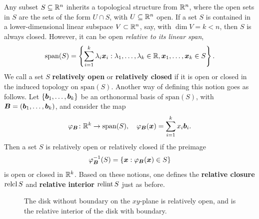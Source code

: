 Any subset $S\subseteq \mathbb{R}^n$ inherits a topological structure from $\mathbb{R}^n$, where the open sets in $S$ are the sets of the form $U\cap S$, with $U\subseteq \mathbb{R}^n$ open. 
If a set $S$ is contained in a lower-dimensional linear subspace $V\subset \mathbb{R}^n$, say, with $\dim V=k<n$, then $S$ is always closed. However, it can be open {\em relative to its linear span},
\begin{equation*}
 \mathrm{span}(S) = \left\{\sum_{i=1}^k \lambda_i \bm{x}_i \mathrel{\mathop{:}} \lambda_1,\dots,\lambda_k\in \mathbb{R}, \bm{x}_1,\dots,\bm{x}_k\in S\right\}.
\end{equation*}
We call a set $S$ \textbf{relatively open} or \textbf{relatively closed} if it is open or closed in the induced topology on $\mathrm{span}(S)$. Another way of defining this notion goes as follows.
Let $\{\bm{b}_1,\dots,\bm{b}_k\}$ be an orthonormal basis of $\mathrm{span}(S)$, with $\bm{B}=(\bm{b}_1,\dots,\bm{b}_k)$, and consider the map
\begin{equation*}
 \varphi_{\bm{B}}\colon \mathbb{R}^k \to \mathrm{span}(S),\quad \varphi_{\bm{B}}(\bm{x})=\sum_{i=1}^k x_i \bm{b}_i.
\end{equation*}
Then a set $S$ is relatively open or relatively closed if the preimage 
\begin{equation*}
\varphi_{\bm{B}}^{-1}(S) = \{\bm{x} \mathrel{\mathop{:}} \varphi_{\bm{B}}(\bm{x})\in S\}
\end{equation*}
is open or closed in $\mathbb{R}^k$. Based on these notions, one defines the \textbf{relative closure} $\operatorname{relcl} S$ and \textbf{relative interior} $\operatorname{relint} S$ just as before.

\begin{figure}[h!]
\centering
{}
\caption{The disk without boundary on the $xy$-plane is relatively open, and is the relative interior of the disk with boundary.} 
\end{figure}

